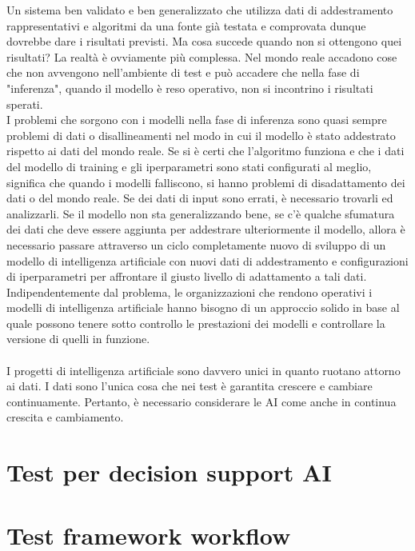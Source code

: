 \documentclass[a4paper,12pt]{report}
\begin{document}
Un sistema ben validato e ben generalizzato che utilizza dati di addestramento rappresentativi e algoritmi da una fonte già testata e comprovata dunque dovrebbe dare i risultati previsti. Ma cosa succede quando non si ottengono quei risultati? La realtà è ovviamente più complessa. Nel mondo reale accadono cose che non avvengono nell'ambiente di test e può accadere che nella fase di "inferenza", quando il modello è reso operativo, non si incontrino i risultati sperati.\\
I problemi che sorgono con i modelli nella fase di inferenza sono quasi sempre problemi di dati o disallineamenti nel modo in cui il modello è stato addestrato rispetto ai dati del mondo reale. Se si è certi che l'algoritmo funziona e che i dati del modello di training e gli iperparametri sono stati configurati al meglio, significa che quando i modelli falliscono, si hanno problemi di disadattamento dei dati o del mondo reale. Se dei dati di input sono errati, è necessario trovarli ed analizzarli. Se il modello non sta generalizzando bene, se c'è qualche sfumatura dei dati che deve essere aggiunta per addestrare ulteriormente il modello, allora è necessario passare attraverso un ciclo completamente nuovo di sviluppo di un modello di intelligenza artificiale con nuovi dati di addestramento e configurazioni di iperparametri per affrontare il giusto livello di adattamento a tali dati. Indipendentemente dal problema, le organizzazioni che rendono operativi i modelli di intelligenza artificiale hanno bisogno di un approccio solido in base al quale possono tenere sotto controllo le prestazioni dei modelli e controllare la versione di quelli in funzione.\\~\\

I progetti di intelligenza artificiale sono davvero unici in quanto ruotano attorno ai dati. I dati sono l'unica cosa che nei test è garantita crescere e cambiare continuamente. Pertanto, è necessario considerare le AI come anche in continua crescita e cambiamento. \cite{aitest}




\section{Test per decision support AI}

\section{Test framework workflow}
\end{document}
